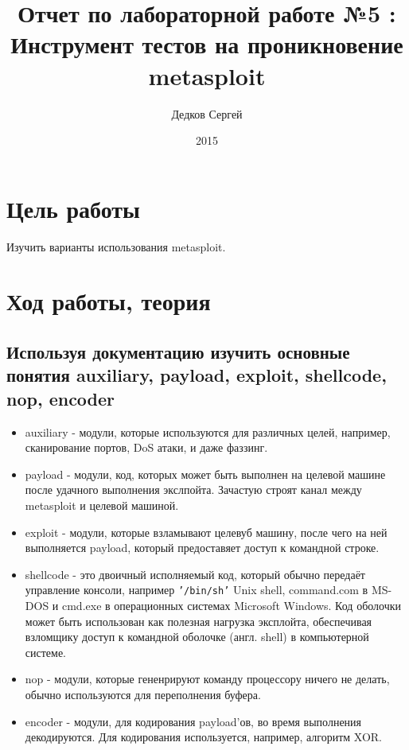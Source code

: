 \documentclass[11pt, a4paper]{article}		%
\author{Дедков Сергей}
\title{Отчет по лабораторной работе №5 :\\ Инструмент тестов на проникновение metasploit}
\date{2015}
\begin{document}
\maketitle
\tableofcontents
\newpage



\section{Цель работы}

Изучить варианты использования metasploit.




\section{Ход работы, теория}



\subsection{Используя документацию изучить основные понятия auxiliary, payload, exploit, shellcode,	nop, encoder}

\begin{itemize}

\item auxiliary - модули, которые используются для различных целей, например, сканирование портов, DoS атаки, и даже фаззинг.

\item payload - модули, код, которых может быть выполнен на целевой машине после удачного выполнения экслпойта. Зачастую строят канал между metasploit и целевой машиной.

\item exploit - модули, которые взламывают целевуб машину, после чего на ней выполняется payload, который предоставяет доступ к командной строке.

\item shellcode - это двоичный исполняемый код, который обычно передаёт управление консоли, например \verb'’/bin/sh’' Unix shell, command.com в MS-DOS и cmd.exe в операционных системах Microsoft Windows. Код оболочки может быть использован как полезная нагрузка эксплойта, обеспечивая взломщику доступ к командной оболочке (англ. shell) в компьютерной системе.

\item nop - модули, которые гененрируют команду процессору ничего не делать, обычно используются для переполнения буфера.

\item encoder - модули, для кодирования payload'ов, во время выполнения декодируются. Для кодирования используется, например, алгоритм XOR. 

\end{itemize}
\end{document}
